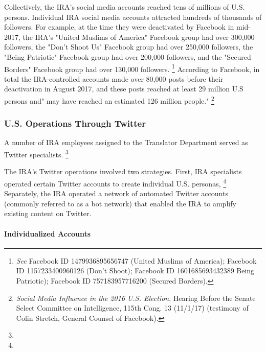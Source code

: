 Collectively, the IRA's social media accounts reached tens of millions of U.S. persons.
Individual IRA social media accounts attracted hundreds of thousands of followers.
For example, at the time they were deactivated by Facebook in mid-2017, the IRA's "United Muslims of America" Facebook group had over 300,000 followers, the "Don't Shoot Us" Facebook group had over 250,000 followers, the "Being Patriotic" Facebook group had over 200,000 followers, and the "Secured Borders" Facebook group had over 130,000 followers.%
\footnote{\textit{See} Facebook ID 1479936895656747 (United Muslims of America);
Facebook ID 1157233400960126 (Don't Shoot);
Facebook ID 1601685693432389 Being Patriotic);
Facebook ID 757183957716200 (Secured Borders).


}
According to Facebook, in total the IRA-controlled accounts made over 80,000 posts before their deactivation in August 2017, and these posts reached at least 29 million U.S persons and" may have reached an estimated 126 million people."%
\footnote{\textit{Social Media Influence in the 2016 U.S. Election}, Hearing Before the Senate Select Committee on Intelligence, 115th Cong. 13 (11/1/17) (testimony of Colin Stretch, General Counsel of Facebook).}

\subsubsection{U.S. Operations Through Twitter}

A number of IRA employees assigned to the Translator Department served as Twitter specialists.
\footnote{}

The IRA's Twitter operations involved two strategies.
First, IRA specialists operated certain Twitter accounts to create individual U.S. personas, %
\footnote{}
Separately, the IRA operated a network of automated Twitter accounts (commonly referred to as a bot network) that enabled the IRA to amplify existing content on Twitter.

\paragraph{Individualized Accounts}


